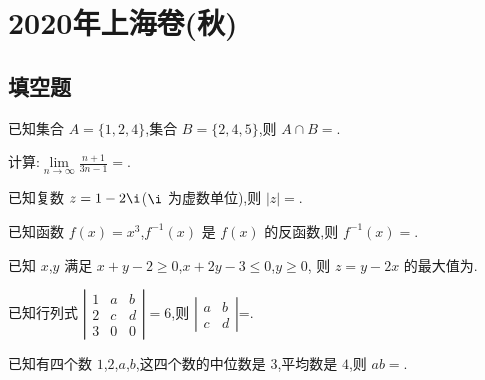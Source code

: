 

\chapter{2020年上海卷(秋)}

\section{填空题}

\begin{problem}
已知集合 \(A=\{1,2,4\}\),集合 \(B=\{2,4,5\}\),则 \(A\cap B=\)\fillinblank{}.
\end{problem}

\begin{problem}
计算:\(\lim\limits_{n\to\infty}\frac{n+1}{3n-1}=\)\fillinblank{}.
\end{problem}

\begin{problem}
已知复数 \(z=1-2\i\)(\(\i\) 为虚数单位),则 \(|z|=\)\fillinblank{}.
\end{problem}

\begin{problem}
已知函数 \(f(x)=x^3\),\(f^{-1}(x)\) 是 \(f(x)\) 的反函数,则 \(f^{-1}(x)=\)\fillinblank{}.
\end{problem}

\begin{problem}
已知 \(x\),\(y\) 满足 \(x+y-2\ge0\),\(x+2y-3\le0\),\(y\ge0\),
则 \(z=y-2x\) 的最大值为\fillinblank{}.

\end{problem}

\begin{problem}
已知行列式 \(\left|\begin{matrix}
1 & a & b\\
2 & c & d\\
3 & 0 & 0
\end{matrix}\right|=6\),则 \(\left|\begin{matrix}
a & b\\
c & d
\end{matrix}\right|\)=\fillinblank{}.
\end{problem}

\begin{problem}
已知有四个数 \(1\),\(2\),\(a\),\(b\),这四个数的中位数是 \(3\),平均数是 \(4\),则 \(ab=\)\fillinblank{}.
\end{problem}

